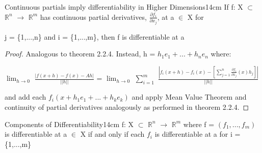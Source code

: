     \newpage



    \begin{wtheorem}{Continuous partials imply differentiability
    in Higher Dimensions}{14cm}
        If f: X $\subset$ $\mathbb{R}^n$ $\rightarrow$ $\mathbb{R}^m$
        has continuous partial derivatives, $\frac{\partial f_i}{\partial x_j}$,
        at a $\in$ X for
        
        j = \{1,...,n\} and i = \{1,...,m\}, then f is differentiable at a
    \end{wtheorem}

    \begin{proof}
        Analogous to {\color{red} theorem 2.2.4}.
        Instead, h = $h_1e_1 + ... + h_ne_n$ where:

        \hspace{0.5cm}
        $\lim_{h \rightarrow 0}$ $\frac{|f(x+h)-f(x)-Ah|}{||h||}$
        = $\lim_{h \rightarrow 0}$ $\sum_{i=1}^m$
            $\frac{|f_i(x+h) - f_i(x)
                    - [\sum_{j=1}^n \frac{\partial f_i}{\partial x_j}(x)h_j]|}
                {||h||}$
        
        and add each $f_i(x+h_1e_1+...+h_ke_k)$ and apply Mean Value Theorem
        and continuity of partial derivatives analogously as performed in
        {\color{red} theorem 2.2.4}.
    \end{proof}

    \vspace{0.5cm}



    \begin{wtheorem}{Components of Differentiability}{14cm}
        f: X $\subset$ $\mathbb{R}^n$ $\rightarrow$ $\mathbb{R}^m$
        where f = $(f_1,...,f_m)$ is differentiable at a $\in$ X if and only if
        each $f_i$ is differentiable at a for i = \{1,...,m\}
    \end{wtheorem}

